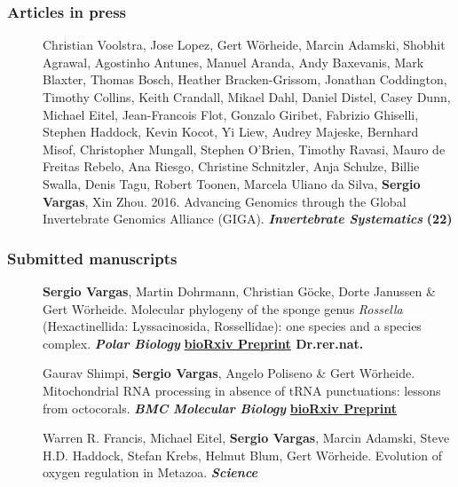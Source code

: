 \documentclass[letter,10pt]{article}
\begin{document}
\subsubsection*{Articles in press}
\begin{description}

\item[] Christian Voolstra, Jose Lopez, Gert W\"orheide, Marcin Adamski, Shobhit Agrawal, Agostinho Antunes, Manuel Aranda, Andy Baxevanis, Mark Blaxter, Thomas Bosch, Heather Bracken-Grissom, Jonathan Coddington, Timothy Collins, Keith Crandall, Mikael Dahl, Daniel Distel, Casey Dunn, Michael Eitel, Jean-Francois Flot, Gonzalo Giribet, Fabrizio Ghiselli, Stephen Haddock, Kevin Kocot, Yi Liew, Audrey Majeske, Bernhard Misof, Christopher Mungall, Stephen O'Brien, Timothy Ravasi, Mauro de Freitas Rebelo, Ana Riesgo, Christine Schnitzler, Anja Schulze, Billie Swalla, Denis Tagu, Robert Toonen, Marcela Uliano da Silva, \textbf{Sergio Vargas}, Xin Zhou. 2016. Advancing Genomics through the Global Invertebrate Genomics Alliance (GIGA). \textbf{\emph{Invertebrate Systematics}} \hfill\textbf{{\scriptsize (22)}}

\end{description}

\subsubsection*{Submitted manuscripts}
\begin{description}
	\item[]\textbf{Sergio Vargas}, Martin Dohrmann, Christian G\"ocke, Dorte Janussen \& Gert W\"orheide. Molecular phylogeny of the sponge genus \emph{Rossella} (Hexactinellida: Lyssacinosida, Rossellidae): one species and a species complex. \textbf{\emph{Polar Biology}} \hfill\textbf{{\scriptsize \href{http://dx.doi.org/10.1101/037440}{bioRxiv Preprint} Dr.rer.nat.}}
  
  \item[]Gaurav Shimpi, \textbf{Sergio Vargas}, Angelo Poliseno \& Gert W\"orheide. Mitochondrial RNA processing in absence of tRNA punctuations: lessons from octocorals. \textbf{\emph{BMC Molecular Biology}} \hfill\textbf{{\scriptsize\href{https://doi.org/10.1101/103036}{bioRxiv Preprint}}}

  \item[]Warren R. Francis, Michael Eitel, \textbf{Sergio Vargas}, Marcin Adamski, Steve H.D. Haddock, Stefan Krebs, Helmut Blum, Gert W\"orheide. Evolution of oxygen regulation in Metazoa. \textbf{\emph{Science}}
  
  \end{description}
\end{document}
